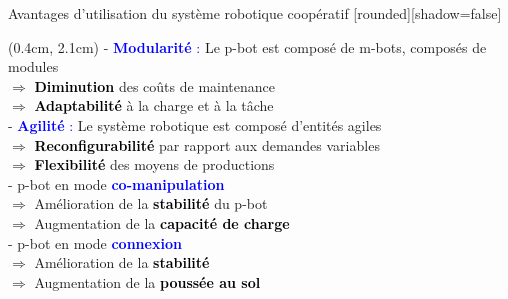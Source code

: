 \documentclass[french]{beamer}
\begin{document}
\begin{frame}{Avantages d'utilisation du système robotique coopératif}
[rounded][shadow=false]
\begin{textblock*}{12cm}(0.4cm, 2.1cm)
  \justifying
  - \textcolor{blue}{\textbf{Modularité} :} Le p-bot est composé de m-bots, composés de modules\\
  \hspace{1.5cm}$\Rightarrow$ \textcolor{black}{\textbf{Diminution}} des coûts de maintenance\\
  \hspace{1.5cm}$\Rightarrow$ \textcolor{black}{\textbf{Adaptabilité}} à la charge et à la tâche\\
  
  \vspace{0.25cm}
  - \textcolor{blue}{\textbf{Agilité} :} Le système robotique est composé d'entités agiles\\
  \hspace{1.5cm}$\Rightarrow$ \textcolor{black}{\textbf{Reconfigurabilité}} par rapport aux demandes variables\\
  \hspace{1.5cm}$\Rightarrow$ \textcolor{black}{\textbf{Flexibilité}} des moyens de productions\\
  
  \vspace{0.25cm}
  - p-bot en mode \textcolor{blue}{\textbf{co-manipulation}}\\
  \hspace{1.5cm}$\Rightarrow$ Amélioration de la \textcolor{black}{\textbf{stabilité}} du p-bot\\
  \hspace{1.5cm}$\Rightarrow$ Augmentation de la \textcolor{black}{\textbf{capacité de charge}}\\
  
  \vspace{0.25cm}
  - p-bot en mode \textcolor{blue}{\textbf{connexion}}\\
  \hspace{1.5cm}$\Rightarrow$ Amélioration de la \textcolor{black}{\textbf{stabilité}}\\
  \hspace{1.5cm}$\Rightarrow$ Augmentation de la \textcolor{black}{\textbf{poussée au sol}}\\
\end{textblock*}
\end{frame}
\end{document}
